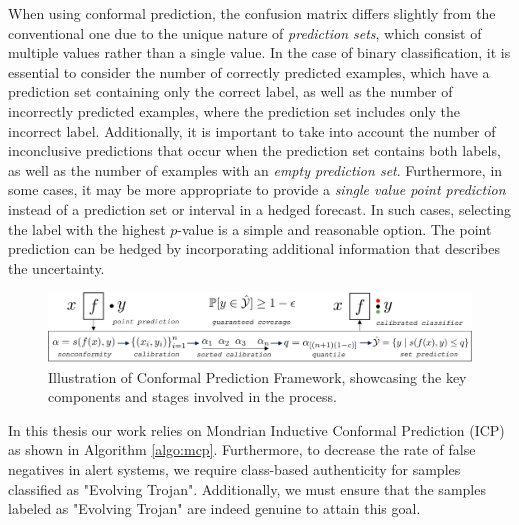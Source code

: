 When using conformal prediction, the confusion matrix differs slightly from the conventional one due to the unique nature of \textit{prediction sets}, which consist of multiple values rather than a single value. In the case of binary classification, it is essential to consider the number of correctly predicted examples, which have a prediction set containing only the correct label, as well as the number of incorrectly predicted examples, where the prediction set includes only the incorrect label. Additionally, it is important to take into account the number of inconclusive predictions that occur when the prediction set contains both labels, as well as the number of examples with an \textit{empty prediction set}. Furthermore, in some cases, it may be more appropriate to provide a \textit{single value point prediction} instead of a prediction set or interval in a hedged forecast. In such cases, selecting the label with the highest $p$-value is a simple and reasonable option. The point prediction can be hedged by incorporating additional information that describes the uncertainty.


\begin{figure}[ht]
  \centering
   \includegraphics[width=0.95\linewidth]{figs/frameowrk_cp.png}
   \caption{Illustration of Conformal Prediction Framework, showcasing the key components and stages involved in the process.}
  \label{fig:frameowrk_cp}
\end{figure}


In this thesis our work relies on Mondrian Inductive Conformal Prediction (ICP) \cite{bostrom2021mondrian} as shown in Algorithm \ref{algo:mcp}. Furthermore, to decrease the rate of false negatives in alert systems, we require class-based authenticity for samples classified as "Evolving Trojan". Additionally, we must ensure that the samples labeled as "Evolving Trojan" are indeed genuine to attain this goal.

